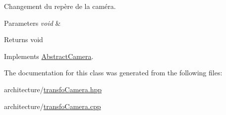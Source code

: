 Changement du repère de la caméra. 


\begin{DoxyParams}{Parameters}
{\em void} & \\
\hline
\end{DoxyParams}
\begin{DoxyReturn}{Returns}
void 
\end{DoxyReturn}


Implements \hyperlink{class_abstract_camera_a4bfcc6ed8980d64cf1d43d7dcb60129b}{Abstract\+Camera}.



The documentation for this class was generated from the following files\+:\begin{DoxyCompactItemize}
\item 
architecture/\hyperlink{transfo_camera_8hpp}{transfo\+Camera.\+hpp}\item 
architecture/\hyperlink{transfo_camera_8cpp}{transfo\+Camera.\+cpp}\end{DoxyCompactItemize}
